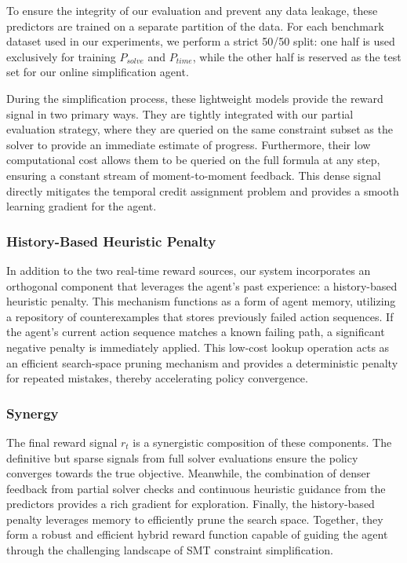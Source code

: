 To ensure the integrity of our evaluation and prevent any data leakage, these predictors are trained on a separate partition of the data. For each benchmark dataset used in our experiments, we perform a strict 50/50 split: one half is used exclusively for training $P_{solve}$ and $P_{time}$, while the other half is reserved as the test set for our online simplification agent. 

During the simplification process, these lightweight models provide the reward signal in two primary ways. They are tightly integrated with our partial evaluation strategy, where they are queried on the same constraint subset as the solver to provide an immediate estimate of progress. Furthermore, their low computational cost allows them to be queried on the full formula at any step, ensuring a constant stream of moment-to-moment feedback. This dense signal directly mitigates the temporal credit assignment problem and provides a smooth learning gradient for the agent.


\subsubsection{History-Based Heuristic Penalty}
In addition to the two real-time reward sources, our system incorporates an orthogonal component that leverages the agent's past experience: a history-based heuristic penalty. This mechanism functions as a form of agent memory, utilizing a repository of counterexamples that stores previously failed action sequences. If the agent's current action sequence matches a known failing path, a significant negative penalty is immediately applied. This low-cost lookup operation acts as an efficient search-space pruning mechanism and provides a deterministic penalty for repeated mistakes, thereby accelerating policy convergence.

\subsubsection{Synergy}
The final reward signal $r_t$ is a synergistic composition of these components. The definitive but sparse signals from full solver evaluations ensure the policy converges towards the true objective. Meanwhile, the combination of denser feedback from partial solver checks and continuous heuristic guidance from the predictors provides a rich gradient for exploration. Finally, the history-based penalty leverages memory to efficiently prune the search space. Together, they form a robust and efficient hybrid reward function capable of guiding the agent through the challenging landscape of SMT constraint simplification.

